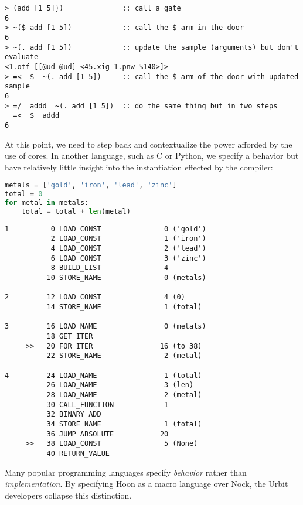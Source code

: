 \begin{lstlisting}[language=hoon,
                   style=nonumbers]
> (add [1 5]})              :: call a gate
6
> ~($ add [1 5])            :: call the $ arm in the door
6
> ~(. add [1 5])            :: update the sample (arguments) but don't evaluate
<1.otf [[@ud @ud] <45.xig 1.pnw %140>]>
> =<  $  ~(. add [1 5])     :: call the $ arm of the door with updated sample
6
> =/  addd  ~(. add [1 5])  :: do the same thing but in two steps
  =<  $  addd
6
\end{lstlisting}




At this point, we need to step back and contextualize the power afforded by the use of cores.  In another language, such as C or Python, we specify a behavior but have relatively little insight into the instantiation effected by the compiler:

\begin{lstlisting}[language=python,
                   caption={Python loop to sum the length of several strings.}]
metals = ['gold', 'iron', 'lead', 'zinc']
total = 0
for metal in metals:
    total = total + len(metal)
\end{lstlisting}

\begin{lstlisting}[language=jvmis,
                   caption={Python bytecode equivalent}]
1          0 LOAD_CONST               0 ('gold')
           2 LOAD_CONST               1 ('iron')
           4 LOAD_CONST               2 ('lead')
           6 LOAD_CONST               3 ('zinc')
           8 BUILD_LIST               4
          10 STORE_NAME               0 (metals)

2         12 LOAD_CONST               4 (0)
          14 STORE_NAME               1 (total)

3         16 LOAD_NAME                0 (metals)
          18 GET_ITER
     >>   20 FOR_ITER                16 (to 38)
          22 STORE_NAME               2 (metal)

4         24 LOAD_NAME                1 (total)
          26 LOAD_NAME                3 (len)
          28 LOAD_NAME                2 (metal)
          30 CALL_FUNCTION            1
          32 BINARY_ADD
          34 STORE_NAME               1 (total)
          36 JUMP_ABSOLUTE           20
     >>   38 LOAD_CONST               5 (None)
          40 RETURN_VALUE
\end{lstlisting}

Many popular programming languages specify \emph{behavior} rather than \emph{implementation}.  By specifying Hoon as a macro language over Nock, the Urbit developers collapse this distinction.

